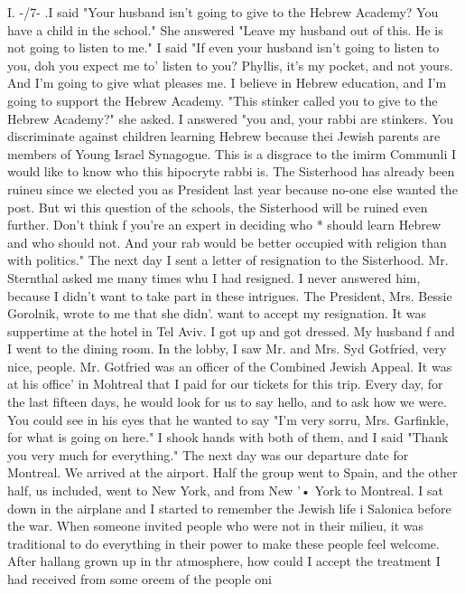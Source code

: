 I.
-/7- 
.I said "Your husband isn't going to give to the Hebrew Academy?
You have a child 
in the school."
She answered "Leave my husband out of this.
He is not going to listen 
to me."
I said "If even your husband isn't going to listen to you, doh you expect me to' 
listen to you?
Phyllis, it's my pocket, and not yours.
And I'm going to give what 
pleases me.
I believe in Hebrew education, and I'm going to support the Hebrew Academy.
"This stinker called you to give to the Hebrew Academy?"
she asked.
I answered "you and, 
your rabbi are stinkers.
You discriminate against children learning Hebrew because thei 
Jewish 
parents are members of Young Israel Synagogue.
This is a disgrace to the imirm Communli 
I would like to know who this hipocryte rabbi is.
The Sisterhood has already been ruineu 
since we elected you as President last year because no-one else wanted the post.
But wi 
this question of the schools, the Sisterhood will be ruined even further.
Don't think 
f 
you're an expert in deciding who * should learn Hebrew and who should not.
And your rab 
would be better occupied with religion than with politics."
The next day I sent a letter of resignation to the Sisterhood.
Mr.
Sternthal asked 
me many times whu I had resigned.
I never answered him, because I didn't want to take 
part in these intrigues.
The President, Mrs.
Bessie Gorolnik, wrote to me that she didn'.
want to accept my resignation.
It was suppertime at the hotel in Tel Aviv.
I got up and got dressed.
My husband f 
and I went to the dining room.
In the lobby, I saw Mr.
and Mrs.
Syd Gotfried, very nice, 
people.
Mr.
Gotfried was an officer of the Combined Jewish Appeal.
It was at his office' 
in Mohtreal that I paid for our tickets for this trip.
Every day, for the last fifteen 
days, he would look for us to say hello, and to ask how we were.
You could see in his 
eyes that he wanted to say "I'm very sorru, Mrs.
Garfinkle, for what is going on here."
I shook hands with both of them, and I said "Thank you very much for everything."
The next day was our departure date for Montreal.
We arrived at the airport.
Half 
the group went to Spain, and the other half, us included, went to New York, and from New '• 
York to Montreal.
I sat down in the airplane and I started to remember the Jewish life i 
Salonica before the war.
When someone invited people who were not in their milieu, it was traditional to do 
everything in their power to make these people feel welcome.
After 
hallang grown up in thr 
atmosphere, how could I accept the treatment I had received from some oreem of the people oni 
